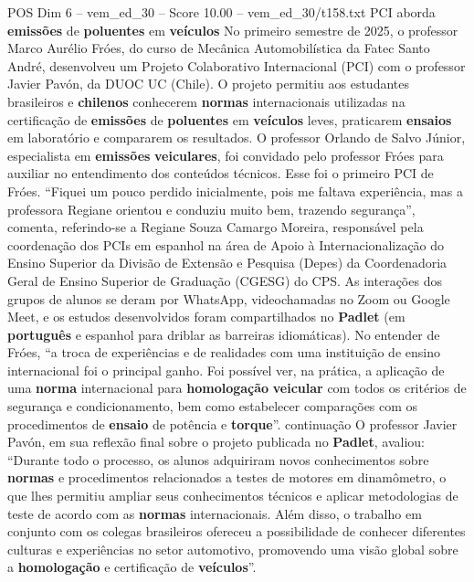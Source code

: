 \begin{textsample}{POS Dim 6 – vem\_ed\_30 – Score 10.00 – vem\_ed\_30/t158.txt}  \label{ex:f6_pos_100}
PCI aborda \textbf{emissões} de \textbf{poluentes} em \textbf{veículos} No primeiro semestre de 2025, o professor Marco Aurélio Fróes, do curso de Mecânica Automobilística da Fatec Santo André, desenvolveu um Projeto Colaborativo Internacional (PCI) com o professor Javier Pavón, da DUOC UC (Chile).
O projeto permitiu aos estudantes brasileiros e \textbf{chilenos} conhecerem \textbf{normas} internacionais utilizadas na certificação de \textbf{emissões} de \textbf{poluentes} em \textbf{veículos} leves, praticarem \textbf{ensaios} em laboratório e compararem os resultados.
O professor Orlando de Salvo Júnior, especialista em \textbf{emissões} \textbf{veiculares}, foi convidado pelo professor Fróes para auxiliar no entendimento dos conteúdos técnicos.
Esse foi o primeiro PCI de Fróes. “Fiquei um pouco perdido inicialmente, pois me faltava experiência, mas a professora Regiane orientou e conduziu muito bem, trazendo segurança”, comenta, referindo-se a Regiane Souza Camargo Moreira, responsável pela coordenação dos PCIs em espanhol na área de Apoio à Internacionalização do Ensino Superior da Divisão de Extensão e Pesquisa (Depes) da Coordenadoria Geral de Ensino Superior de Graduação (CGESG) do CPS.
As interações dos grupos de alunos se deram por WhatsApp, videochamadas no Zoom ou Google Meet, e os estudos desenvolvidos foram compartilhados no \textbf{Padlet} (em \textbf{português} e espanhol para driblar as barreiras idiomáticas).
No entender de Fróes, “a troca de experiências e de realidades com uma instituição de ensino internacional foi o principal ganho.
Foi possível ver, na prática, a aplicação de uma \textbf{norma} internacional para \textbf{homologação} \textbf{veicular} com todos os critérios de segurança e condicionamento, bem como estabelecer comparações com os procedimentos de \textbf{ensaio} de potência e \textbf{torque}”. continuação O professor Javier Pavón, em sua reflexão final sobre o projeto publicada no \textbf{Padlet}, avaliou: “Durante todo o processo, os alunos adquiriram novos conhecimentos sobre \textbf{normas} e procedimentos relacionados a testes de motores em dinamômetro, o que lhes permitiu ampliar seus conhecimentos técnicos e aplicar metodologias de teste de acordo com as \textbf{normas} internacionais.
Além disso, o trabalho em conjunto com os colegas brasileiros ofereceu a possibilidade de conhecer diferentes culturas e experiências no setor automotivo, promovendo uma visão global sobre a \textbf{homologação} e certificação de \textbf{veículos}”.

\end{textsample}
